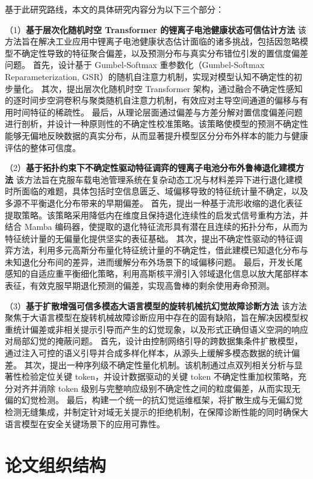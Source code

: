 基于此研究路线，本文的具体研究内容分为以下三个部分：

（1）\textbf{基于层次化随机时空 Transformer 的锂离子电池健康状态可信估计方法}
该方法旨在解决工业应用中锂离子电池健康状态估计面临的诸多挑战，包括因忽略模型不确定性导致的特征聚合偏差，以及预测分布与真实分布错位引发的置信度偏差问题。
首先，设计基于 Gumbel-Softmax 重参数化（Gumbel-Softmax Reparameterization, GSR）的随机自注意力机制，实现对模型认知不确定性的初步量化。
其次，提出层次化随机时空 Transformer 架构，通过融合不确定性感知的逐时间步空洞卷积与聚类随机自注意力机制，有效应对主导空间通道的偏移与有用时间特征的稀疏性。
最后，从理论层面通过偏差与方差分解对置信度偏差问题进行剖析，并设计一种原则性的不确定性校准策略。该策略使模型的预测不确定性能够无偏地反映数据的真实分布，从而显著提升模型区分分布外样本的能力与健康评估的整体可信度。

（2）\textbf{基于拓扑约束下不确定性驱动特征调弈的锂离子电池分布外鲁棒退化建模方法}
该方法旨在克服车载电池管理系统在复杂动态工况与材料差异下进行退化建模时所面临的难题，具体包括时空信息匮乏、域偏移导致的特征统计量不确定，以及多源不平衡退化分布带来的早期偏差。
首先，提出一种基于流形收缩的退化表征提取策略。该策略采用降低内在维度且保持退化连续性的启发式信号重构方法，并结合 Mamba 编码器，使提取的退化特征流形具有潜在且连续的拓扑分布，从而为特征统计量的无偏量化提供坚实的表征基础。
其次，提出不确定性驱动的特征调弈方法，利用多元高斯分布量化特征统计量的不确定性，借此建模已知退化分布与未知退化分布间的差异，进而缓解分布外场景下的域偏移问题。
最后，开发长尾感知的自适应重平衡细化策略，利用高斯核平滑引入邻域退化信息以放大尾部样本表征，有效克服早期退化预测的偏差，实现高鲁棒的剩余使用寿命预测。

（3）\textbf{基于扩散增强可信多模态大语言模型的旋转机械抗幻觉故障诊断方法}
该方法聚焦于大语言模型在旋转机械故障诊断应用中存在的固有缺陷，旨在解决因模型权重统计偏差或非相关提示引导而产生的幻觉现象，以及形式正确但语义空洞的响应对局部幻觉的掩蔽问题。
首先，设计由控制网络引导的跨数据集条件扩散模型，通过注入可控的语义引导并合成多样化样本，从源头上缓解多模态数据的统计偏差。
其次，提出一种序列级不确定性量化机制。该机制通过点双列相关分析与显著性检验定位关键 token，并设计数据驱动的关键 token 不确定性重加权策略，充分对齐并消除 token 级别与完整响应级别不确定性之间的粒度偏差，从而实现无偏的幻觉检测。
最后，构建一个统一的抗幻觉运维框架，将扩散生成与无偏幻觉检测无缝集成，并制定针对域无关提示的拒绝机制，在保障诊断性能的同时确保大语言模型在安全关键场景下的应用可靠性。

\section{论文组织结构}\label{sec:Intro_thesis_structure}

